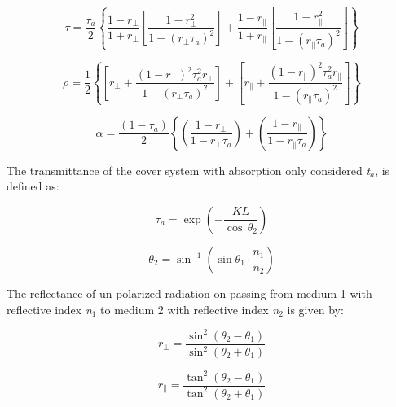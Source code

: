 \begin{equation}
\tau  = \frac{{{\tau_a}}}{2}\left\{ {\frac{{1 - {r_ \bot }}}{{1 + {r_ \bot }}}\left[ {\frac{{1 - r_ \bot ^2}}{{1 - {{\left( {{r_ \bot }{\tau_a}} \right)}^2}}}} \right] + \frac{{1 - {r_\parallel }}}{{1 + {r_\parallel }}}\left[ {\frac{{1 - r_\parallel ^2}}{{1 - {{\left( {{r_\parallel }{\tau_a}} \right)}^2}}}} \right]} \right\}
\end{equation}

\begin{equation}
\rho  = \frac{1}{2}\left\{ {\left[ {{r_ \bot } + \frac{{{{\left( {1 - {r_ \bot }} \right)}^2}\tau_a^2{r_ \bot }}}{{1 - {{\left( {{r_ \bot }{\tau_a}} \right)}^2}}}} \right] + \left[ {{r_\parallel } + \frac{{{{\left( {1 - {r_\parallel }} \right)}^2}\tau_a^2{r_\parallel }}}{{1 - {{\left( {{r_\parallel }{\tau_a}} \right)}^2}}}} \right]} \right\}
\end{equation}

\begin{equation}
\alpha  = \frac{{\left( {1 - {\tau_a}} \right)}}{2}\left\{ {\left( {\frac{{1 - {r_ \bot }}}{{1 - {r_ \bot }{\tau_a}}}} \right) + \left( {\frac{{1 - {r_\parallel }}}{{1 - {r_\parallel }{\tau_a}}}} \right)} \right\}
\end{equation}

The transmittance of the cover system with absorption only considered \emph{t}\(_{a}\), is defined as:

\begin{equation}
{\tau_a} = \exp \left( { - \frac{{KL}}{{\cos \,{\theta_2}}}} \right)
\end{equation}

\begin{equation}
{\theta_2} = {\sin ^{ - 1}}\left( {\sin {\theta_1} \cdot \frac{{{n_1}}}{{{n_2}}}} \right)
\end{equation}

The reflectance of un-polarized radiation on passing from medium 1 with reflective index \emph{n}\(_{1}\) to medium 2 with reflective index \emph{n}\(_{2}\) is given by:

\begin{equation}
{r_ \bot } = \frac{{{{\sin }^2}\left( {{\theta_2} - {\theta_1}} \right)}}{{{{\sin }^2}\left( {{\theta_2} + {\theta_1}} \right)}}
\end{equation}

\begin{equation}
{r_\parallel } = \frac{{{{\tan }^2}\left( {{\theta_2} - {\theta_1}} \right)}}{{{{\tan }^2}\left( {{\theta_2} + {\theta_1}} \right)}}
\end{equation}

